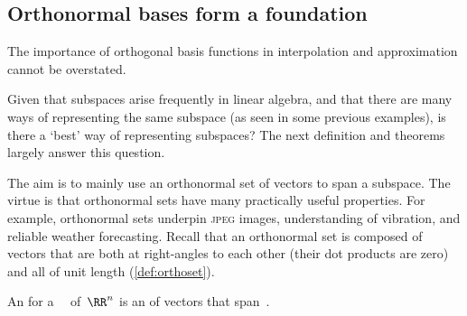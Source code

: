 





\subsection{Orthonormal bases form a foundation}


\begin{quoted}{\cite[\S5.3]{Cuyt2015}}
The importance of orthogonal basis functions in interpolation and approximation cannot be overstated.  
\end{quoted}

Given that subspaces arise frequently in linear algebra, and that there are many ways of representing the same subspace (as seen in some previous examples), is there a `best' way of representing subspaces?
The next definition and theorems largely answer this question.

The aim is to mainly use an orthonormal set of vectors to span a subspace.
The virtue is that orthonormal sets have many practically useful properties.
For example, orthonormal sets underpin \textsc{jpeg} images, understanding of vibration, and reliable weather forecasting.
Recall that an orthonormal set is composed of vectors that are both at right-angles to each other (their dot products are zero) and all of unit length (\autoref{def:orthoset}).


\begin{definition} \label{def:orthobasis} 
An  for a ~\WW\ of~\(\RR^n\) is an  of vectors that span~\WW.
\end{definition}


